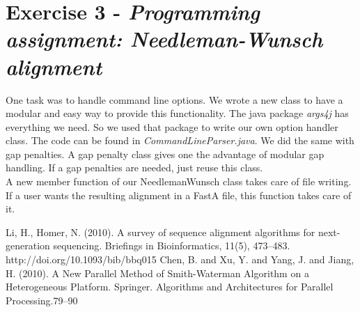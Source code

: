 \documentclass[%
   10pt,              %
   ngerman,           %
   a4paper,           %
   DIV11,             %
]{scrartcl}%
\begin{document}
  \section*{Exercise 3 - \textsl{Programming assignment: Needleman-Wunsch alignment}}
  One task was to handle command line options. We wrote a new class to have a modular 
  and easy way to provide this functionality. The java package \textit{args4j} has everything
  we need. So we used that package to write our own option handler class. The code can 
  be found in \textit{CommandLineParser.java}. We did the same with gap penalties. A
  gap penalty class gives one the advantage of modular gap handling. If a gap penalties are
  needed, just reuse this class.\\
  A new member function of our NeedlemanWunsch class takes care of file writing. If a user 
  wants the resulting alignment in a FastA file, this function takes care of it.

\begin{thebibliography}{widestlabel}
	Li, H., Homer, N. (2010). A survey of sequence alignment algorithms for next-generation sequencing. Briefings in Bioinformatics, 11(5), 473–483. http://doi.org/10.1093/bib/bbq015
		Chen, B. and Xu, Y. and Yang, J. and Jiang, H. (2010). A New Parallel Method of Smith-Waterman Algorithm on a Heterogeneous Platform. Springer. Algorithms and Architectures for Parallel Processing.79–90
\end{thebibliography}
\end{document}
